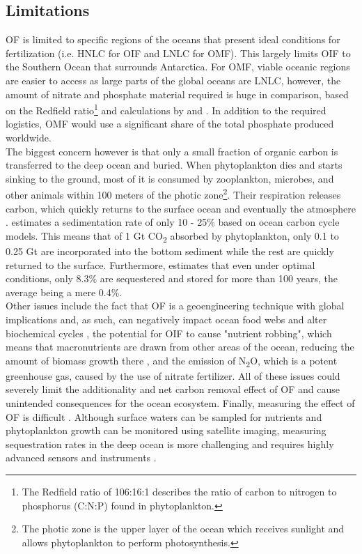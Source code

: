 \subsection*{Limitations}
OF is limited to specific regions of the oceans that present ideal conditions for fertilization (i.e. HNLC for OIF and LNLC for OMF). This largely limits OIF to the Southern Ocean that surrounds Antarctica. For OMF, viable oceanic regions are easier to access as large parts of the global oceans are LNLC, however, the amount of nitrate and phosphate material required is huge in comparison, based on the Redfield ratio\footnote{The Redfield ratio of 106:16:1 describes the ratio of carbon to nitrogen to phosphorus (C:N:P) found in phytoplankton.} and calculations by \textcite{S.F.Jones2014TheNourishment} and \textcite{Harrison2017GlobalFertilization}. In addition to the required logistics, OMF would use a significant share of the total phosphate produced worldwide.\\
The biggest concern however is that only a small fraction of organic carbon is transferred to the deep ocean and buried. When phytoplankton dies and starts sinking to the ground, most of it is consumed by zooplankton, microbes, and other animals within 100 meters of the photic zone\footnote{The photic zone is the upper layer of the ocean which receives sunlight and allows phytoplankton to perform photosynthesis.}. Their respiration releases carbon, which quickly returns to the surface ocean and eventually the atmosphere \parencite[82, 84]{NAS2022ASequestration}.
\textcite{Zeebe2005FeasibilityLevels} estimates a sedimentation rate of only 10 - 25\% based on ocean carbon cycle models. This means that of 1 Gt CO\textsubscript{2} absorbed by phytoplankton, only 0.1 to 0.25 Gt are incorporated into the bottom sediment while the rest are quickly returned to the surface. Furthermore, \textcite{Harrison2013AOcean} estimates that even under optimal conditions, only 8.3\% are sequestered and stored for more than 100 years, the average being a mere 0.4\%.\\
Other issues include the fact that OF is a geoengineering technique with global implications and, as such, can negatively impact ocean food webs and alter biochemical cycles \parencite{Chisholm2001Dis-CreditingFertilization, Zeebe2005FeasibilityLevels}, the potential for OIF to cause "nutrient robbing", which means that macronutrients are drawn from other areas of the ocean, reducing the amount of biomass growth there \parencite{Zeebe2005FeasibilityLevels}, and the emission of N\textsubscript{2}O, which is a potent greenhouse gas, caused by the use of nitrate fertilizer. All of these issues could severely limit the additionality and net carbon removal effect of OF and cause unintended consequences for the ocean ecosystem.
Finally, measuring the effect of OF is difficult \parencite[87]{NAS2022ASequestration}. Although surface waters can be sampled for nutrients and phytoplankton growth can be monitored using satellite imaging, measuring sequestration rates in the deep ocean is more challenging and requires highly advanced sensors and instruments \parencite{Chisholm2001Dis-CreditingFertilization, NAS2022ASequestration}.
